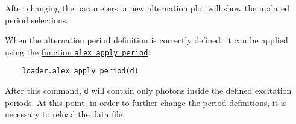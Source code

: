 After changing the parameters, a new alternation plot will show the updated 
period selections.

When the alternation period definition is correctly defined, it can
be applied using the
\href{http://fretbursts.readthedocs.org/en/latest/loader.html#fretbursts.loader.alex_apply_period}{function \texttt{alex\_apply\_period}}:

\begin{verbatim}
    loader.alex_apply_period(d)
\end{verbatim}

After this command, \verb|d| will contain only photons inside the defined excitation periods. 
At this point, in order to further change the period definitions,
it is necessary to reload the data file.
